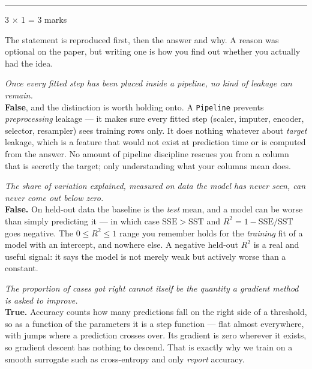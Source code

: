 \documentclass[10pt,a4paper]{article}
\newcommand{\parthead}[2]{\vspace{2pt}\noindent\rule{\linewidth}{0.4pt}\par\vspace{2pt}%
  \noindent{\bfseries Part #1}\hfill{\small #2}\par\vspace{1pt}}
\begin{document}
\parthead{C --- True or false}{3 $\times$ 1 = 3 marks}

{\small The statement is reproduced first, then the answer and why. A reason was optional on the paper, but writing one is how you find out whether you actually had the idea.}

\begin{sC}

  \item \emph{Once every fitted step has been placed inside a pipeline, no kind of leakage can remain.}\\[2pt] \textbf{False}, and the distinction is worth holding onto. A \texttt{Pipeline} prevents \emph{preprocessing} leakage --- it makes sure every fitted step (scaler, imputer, encoder, selector, resampler) sees training rows only. It does nothing whatever about \emph{target} leakage, which is a feature that would not exist at prediction time or is computed from the answer. No amount of pipeline discipline rescues you from a column that is secretly the target; only understanding what your columns mean does.

  \item \emph{The share of variation explained, measured on data the model has never seen, can never come out below zero.}\\[2pt] \textbf{False.} On held-out data the baseline is the \emph{test} mean, and a model can be worse than simply predicting it --- in which case $\mathrm{SSE} > \mathrm{SST}$ and $R^2 = 1 - \mathrm{SSE}/\mathrm{SST}$ goes negative. The $0 \le R^2 \le 1$ range you remember holds for the \emph{training} fit of a model with an intercept, and nowhere else. A negative held-out $R^2$ is a real and useful signal: it says the model is not merely weak but actively worse than a constant.

  \item \emph{The proportion of cases got right cannot itself be the quantity a gradient method is asked to improve.}\\[2pt] \textbf{True.} Accuracy counts how many predictions fall on the right side of a threshold, so as a function of the parameters it is a step function --- flat almost everywhere, with jumps where a prediction crosses over. Its gradient is zero wherever it exists, so gradient descent has nothing to descend. That is exactly why we train on a smooth surrogate such as cross-entropy and only \emph{report} accuracy.

\end{sC}
\end{document}
